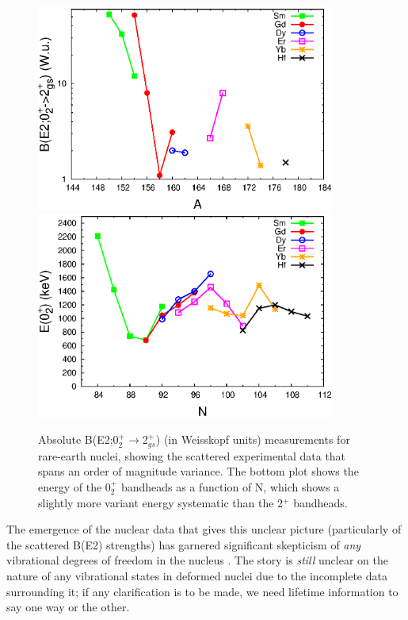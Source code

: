 \begin{figure}[h!]
\begin{center}
\includegraphics[width=0.88\textwidth]{Rare_Earth_02_BE2.eps}\\
\includegraphics[width=0.88\textwidth]{Rare_Earth_0s_N.eps}\\
\end{center}
\caption{Absolute B(E2;0$^+_2\rightarrow$2$^+_{gs}$) (in Weisskopf units) measurements for rare-earth nuclei, showing the scattered experimental data that spans an order of magnitude variance. The bottom plot shows the energy of the 0$^+_2$ bandheads as a function of N, which shows a slightly more variant energy systematic than the 2$^+$ bandheads. \label{fig:Rare_Earth_02_BE2}}
\end{figure}

The emergence of the nuclear data that gives this unclear picture (particularly of the scattered B(E2) strengths) has garnered significant skepticism of \textit{any} vibrational degrees of freedom in the nucleus \cite{Garrett_betavib2001}. The story is \textit{still} unclear on the nature of any vibrational states in deformed nuclei due to the incomplete data surrounding it; if any clarification is to be made, we need lifetime information to say one way or the other.


